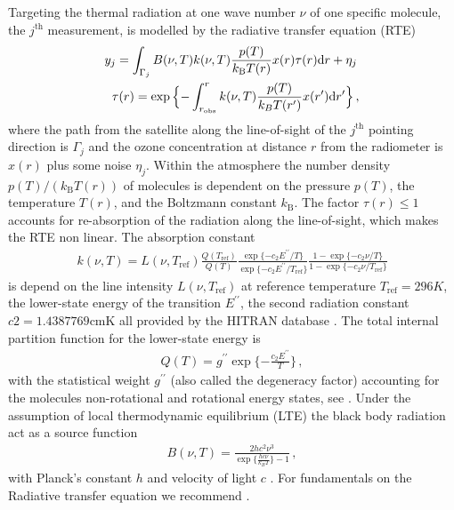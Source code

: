 Targeting the thermal radiation at one wave number $\nu$ of one specific molecule, the $j^\text{th}$ measurement, is modelled by the radiative transfer equation (RTE)~\cite{mipas2000handbook}
\begin{align}
	\label{eq:RTE} 
	y_j =   \int_{\Gamma_j}  B(\nu,T) k(\nu, T)   \frac{p(T)}{k_{\text{B}} T(r)}  x(r)  \tau(r) \text{d}r + \eta_j \, \\
	\tau(r) = \exp{ \Bigl\{ - \int^{r}_{r_\text{obs}}  k(\nu, T)   \frac{p(T)}{k_B T(r^{\prime})}  x(r^{\prime}) \text{d}r^{\prime} \Bigr\} } \, ,\label{eq:absRTE} 
\end{align}
where the path from the satellite along the line-of-sight of the $j^\text{th}$ pointing direction is $\Gamma_j$ and the ozone concentration at distance $r$ from the radiometer is $x(r)$ plus some noise $\eta_j$.
Within the atmosphere the number density $p(T) / (k_{\text{B}} T(r))$ of molecules is dependent on the pressure $p(T)$, the temperature $T(r)$, and the Boltzmann constant $k_{\text{B}}$.
The factor $\tau(r)\leq 1$ accounts for re-absorption of the radiation along the line-of-sight, which makes the RTE non linear.
The absorption constant
\begin{align}
	k(\nu, T) = L(\nu, T_{\text{ref}}) \frac{Q(T_{\text{ref}})}{Q(T)} \frac{ \exp{\{ - c_2 E^{\prime \prime} / T\}} }{\exp{\{ - c_2 E^{\prime \prime} / T_{\text{ref}} \}}} \frac{ 1- \exp{\{ - c_2 \nu  / T \}} }{1 - \exp{\{ - c_2 \nu / T_{\text{ref}} \}}}
\end{align}
is depend on the line intensity $L(\nu, T_{\text{ref}})$ at reference temperature $T_{\text{ref}} =296K $, the lower-state energy of the transition $ E^{\prime \prime} $, the second radiation constant $c2=1.4387769\text{cmK}$ all provided by the HITRAN database \cite{gordon2022hitran2020}.
The total internal partition function for the lower-state energy is
\begin{align}
	Q(T )= g^{\prime \prime} \exp{\{ - \frac{ c_2 E^{\prime \prime} }{T}\}} \, ,
\end{align}
with the statistical weight $ g^{\prime \prime}$ (also called the degeneracy factor) accounting for the molecules non-rotational and rotational energy states, see \cite{vsimevckova2006einstein}.
Under the assumption of local thermodynamic equilibrium (LTE) the black body radiation act as a source function
\begin{align}
	B(\nu,T)   = \frac{2 h c^2 \nu^3}{\exp{\{\frac{hc\nu}{k_B T}\}}-1}\, ,
\end{align}
with Planck's constant $h$ and velocity of light $c$ \cite{}.
For fundamentals on the Radiative transfer equation we recommend \cite[Chapter 1]{rybicki2000rte}.

